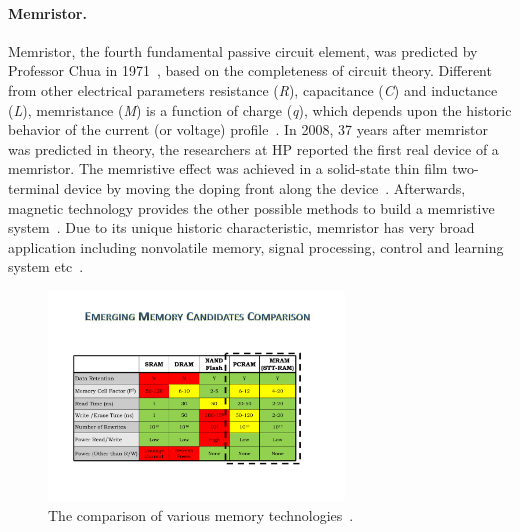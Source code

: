 \paragraph{Memristor.} Memristor, the fourth fundamental passive circuit
element, was predicted by Professor Chua in 1971~\cite{Chua71},
based on the completeness of circuit theory.
Different from other electrical
parameters resistance (\textit{R}), capacitance (\textit{C}) and
inductance (\textit{L}), memristance (\textit{M}) is a function of
charge (\textit{q}),  which depends upon the historic behavior of
the current (or voltage) profile~\cite{Chua76}. In 2008, 37 years after memristor was predicted in theory, the
researchers at HP reported the first real device of a memristor.
The memristive effect was achieved in a solid-state thin film
two-terminal device by moving the doping front along the
device~\cite{Tour08}. Afterwards, magnetic technology provides the
other possible methods to build a memristive
system~\cite{Pershin08,Wang09}. Due to its unique historic
characteristic, memristor has very broad application including
nonvolatile memory, signal processing, control and learning system
etc~\cite{Chen09}.



\begin{figure}
\centering
\vspace{-10pt} \includegraphics[width=0.7\textwidth]{./figure/table.pdf} \vspace{-10pt}
\caption{The comparison of various memory
technologies~\cite{ITRS07}.}\label{table} \vspace{-10pt}
\end{figure}
